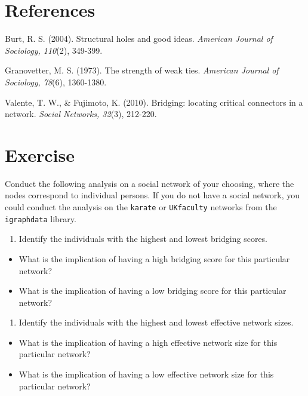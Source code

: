 \documentclass[
]{book}
\providecommand{\tightlist}{%
  \setlength{\itemsep}{0pt}\setlength{\parskip}{0pt}}
\begin{document}
\section{References}\label{references-1}

Burt, R. S. (2004). Structural holes and good ideas. \emph{American Journal of Sociology, 110}(2), 349-399.

Granovetter, M. S. (1973). The strength of weak ties. \emph{American Journal of Sociology, 78}(6), 1360-1380.

Valente, T. W., \& Fujimoto, K. (2010). Bridging: locating critical connectors in a network. \emph{Social Networks, 32}(3), 212-220.

\section{Exercise}\label{exercise-8}

Conduct the following analysis on a social network of your choosing, where the nodes correspond to individual persons. If you do not have a social network, you could conduct the analysis on the \texttt{karate} or \texttt{UKfaculty} networks from the \texttt{igraphdata} library.

\begin{enumerate}
\def\labelenumi{\arabic{enumi}.}
\tightlist
\item
  Identify the individuals with the highest and lowest bridging scores.
\end{enumerate}

\begin{itemize}
\tightlist
\item
  What is the implication of having a high bridging score for this particular network?
\item
  What is the implication of having a low bridging score for this particular network?
\end{itemize}

\begin{enumerate}
\def\labelenumi{\arabic{enumi}.}
\setcounter{enumi}{1}
\tightlist
\item
  Identify the individuals with the highest and lowest effective network sizes.
\end{enumerate}

\begin{itemize}
\tightlist
\item
  What is the implication of having a high effective network size for this particular network?
\item
  What is the implication of having a low effective network size for this particular network?
\end{itemize}
\end{document}

